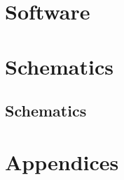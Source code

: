 
\fi



\ifdefined\renderpartsoftware
\part{Software}
  \glsresetall


\fi


\ifdefined\renderpartschematics
\part{Schematics}

\chapter{Schematics}
\glsresetall
 
\fi


\ifdefined\renderpartbackmatter
  \appendix
  \part{Appendices}

  \backmatter
  \renewcommand{\thepage}{\roman{page}}

  \glsaddall
  \printglossaries

  \printindex
\fi



